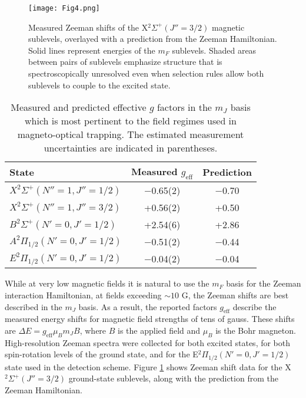 \documentclass[amsmath,amssymb,aps,twocolumn,longbibliography,notitlepage]{revtex4-1}
\begin{document}
\begin{figure}
\texttt{[image: Fig4.png]}
\caption{Measured Zeeman shifts of the X$^2\Sigma^+(J''=3/2)$ magnetic sublevels, overlayed with a prediction from the Zeeman Hamiltonian.  Solid lines represent energies of the $m_F$ sublevels.  Shaded areas between pairs of sublevels emphasize structure that is spectroscopically unresolved even when selection rules allow both sublevels to couple to the excited state.}
\label{fig:zeeman}
\centering
\end{figure}
\begingroup
\begin{table}%
\caption{\label{table:gfactors}Measured and predicted effective $g$ factors in the $m_J$ basis which is most pertinent to the field regimes used in magneto-optical trapping.  The estimated measurement uncertainties are indicated in parentheses.
}
\begin{ruledtabular}
\begin{tabular}{l c c}
State & Measured $g_{\mathrm{eff}}$ & Prediction\\
\hline
$X^2\Sigma^+(N''=1, J''=1/2)$ & $-$0.65(2) & $-$0.70 \\
$X^2\Sigma^+(N''=1, J''=3/2)$ & +0.56(2) & +0.50 \\
\hline
$B^2\Sigma^+(N'=0, J'=1/2)$ & +2.54(6) & +2.86\\
\hline
$A^2\Pi_{1/2}(N'=0, J'=1/2)$ & $-$0.51(2) & $-$0.44\\
\hline
$E^2\Pi_{1/2}(N'=0, J'=1/2)$ & $-$0.04(2) & $-$0.04\\
\end{tabular}
\end{ruledtabular}
\end{table}
\endgroup
While at very low magnetic fields it is natural to use the $m_F$ basis for the Zeeman interaction Hamiltonian, at fields exceeding $\sim10$ G, the Zeeman shifts are best described in the $m_J$ basis.  As a result, the reported factors $g_{\mathrm{eff}}$ describe the measured energy shifts for magnetic field strengths of tens of gauss.  These shifts are $\Delta E=g_{\mathrm{eff}}\mu_B m_J B$, where $B$ is the applied field and $\mu_B$ is the Bohr magneton.
High-resolution Zeeman spectra were collected for both excited states, for both spin-rotation levels of the ground state, and for the E$^2\Pi_{1/2}(N'=0,J'=1/2)$ state used in the detection scheme.  Figure \ref{fig:zeeman} shows Zeeman shift data for the X$^2\Sigma^+(J''=3/2)$ ground-state sublevels, along with the prediction from the Zeeman Hamiltonian.
\end{document}
